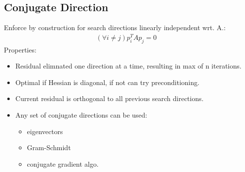 \documentclass[8pt,letter]{article}
\begin{document}
\begin{multicols*}{2}
  \subsection{Conjugate Direction}
  
  Enforce by construction for search directions linearly independent wrt. A.:
  \begin{align*}
    (\forall i\not=j) p_i^T A p_j = 0
  \end{align*}
  Properties:
  \begin{itemize}
  \item Residual elimnated one direction at a time, resulting in max of n iterations.
  \item Optimal if Hessian is diagonal, if not can try preconditioning.
  \item Current residual is orthogonal to all previous search directions.
  \item Any set of conjugate directions can be used:
    \begin{itemize}
    \item eigenvectors
    \item Gram-Schmidt
    \item conjugate gradient algo.
    \end{itemize}
  \end{itemize}
    

\end{multicols*}
\end{document}
